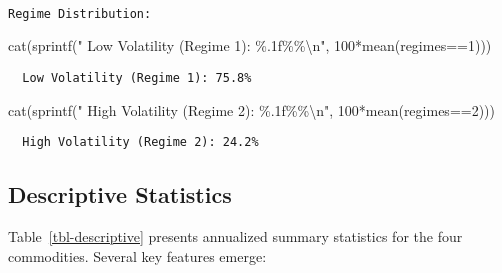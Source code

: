 \documentclass[
  10pt,
  a4paper,
]{article}
\newenvironment{Shaded}{\begin{snugshade}}{\end{snugshade}}
\newcommand{\DecValTok}[1]{\textcolor[rgb]{0.68,0.00,0.00}{#1}}
\newcommand{\FunctionTok}[1]{\textcolor[rgb]{0.28,0.35,0.67}{#1}}
\newcommand{\NormalTok}[1]{\textcolor[rgb]{0.00,0.23,0.31}{#1}}
\newcommand{\SpecialCharTok}[1]{\textcolor[rgb]{0.37,0.37,0.37}{#1}}
\newcommand{\StringTok}[1]{\textcolor[rgb]{0.13,0.47,0.30}{#1}}
\begin{document}
\begin{verbatim}

Regime Distribution:
\end{verbatim}

\begin{Shaded}
\begin{Highlighting}[]
\FunctionTok{cat}\NormalTok{(}\FunctionTok{sprintf}\NormalTok{(}\StringTok{"  Low Volatility (Regime 1): \%.1f\%\%}\SpecialCharTok{\textbackslash{}n}\StringTok{"}\NormalTok{, }\DecValTok{100}\SpecialCharTok{*}\FunctionTok{mean}\NormalTok{(regimes}\SpecialCharTok{==}\DecValTok{1}\NormalTok{)))}
\end{Highlighting}
\end{Shaded}

\begin{verbatim}
  Low Volatility (Regime 1): 75.8%
\end{verbatim}

\begin{Shaded}
\begin{Highlighting}[]
\FunctionTok{cat}\NormalTok{(}\FunctionTok{sprintf}\NormalTok{(}\StringTok{"  High Volatility (Regime 2): \%.1f\%\%}\SpecialCharTok{\textbackslash{}n}\StringTok{"}\NormalTok{, }\DecValTok{100}\SpecialCharTok{*}\FunctionTok{mean}\NormalTok{(regimes}\SpecialCharTok{==}\DecValTok{2}\NormalTok{)))}
\end{Highlighting}
\end{Shaded}

\begin{verbatim}
  High Volatility (Regime 2): 24.2%
\end{verbatim}

\subsection{Descriptive Statistics}\label{sec-descriptive}

Table~\ref{tbl-descriptive} presents annualized summary statistics for
the four commodities. Several key features emerge:
\end{document}
